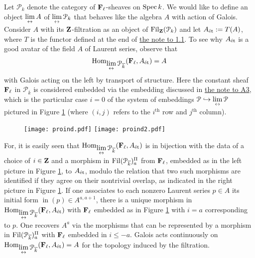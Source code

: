 \documentclass[deligne.tex]{subfiles}
\begin{document}
Let $\mathcal P_k$ denote the category of $\mathbf{F}_\ell$-sheaves on $\operatorname{Spec} k$.
We would like to define an object $\displaystyle\lim_{\leftrightarrow} A$ of $\displaystyle\lim_{\leftrightarrow}\mathcal P_k$ that
behaves like the algebra $A$ with action of Galois.
Consider $A$ with its $\mathbf{Z}$-filtration as an object of $\operatorname{Fil}_{\mathbf{Z}}(\mathcal P_k)$
and let $A_{\text{\'et}}:=T(A)$, where $T$ is the functor defined at the end of
\hyperref[glue:1.1]{the note to 1.1}.
To see why $A_{\text{\'et}}$ is a good avatar of the field $A$ of Laurent 
series, observe that
\begin{equation*}
	\operatorname{Hom}_{\displaystyle\lim_{\leftrightarrow}\mathcal P_{\overline k}}(\mathbf{F}_\ell,A_{\text{\'et}})=A
\end{equation*}
with Galois acting on the left by transport of structure.
Here the constant sheaf $\mathbf{F}_\ell$ in $\mathcal P_{\overline k}$ is
considered embedded via the embedding discussed in
\hyperref[glue:A3]{the note to A3},
which is the particular case $i=0$ of the system of embeddings
$\mathcal P\hookrightarrow\displaystyle\lim_{\leftrightarrow}\mathcal P$ pictured in
Figure \ref{fig:proind} (where $(i,j)$ refers to the $i^\text{th}$ row and
$j^\text{th}$ column).
\begin{figure}[h]
\centering
\texttt{[image: proind.pdf]}\hspace{3em}
\texttt{[image: proind2.pdf]}
\caption{}
\label{fig:proind}
\end{figure}
For, it is easily seen that
$\operatorname{Hom}_{\displaystyle\lim_{\leftrightarrow}\mathcal P_{\overline k}}(\mathbf{F}_\ell,A_{\text{\'et}})$
is in bijection with the data of a choice of $i\in\mathbf{Z}$ and a morphism in
$\operatorname{Fil}(\mathcal P_{\overline k})_a^\Pi$ from $\mathbf{F}_\ell$, embedded as in the
left picture in Figure \ref{fig:proind}, to $A_{\text{\'et}}$, modulo the
relation that two such morphisms are identified if they agree on their
nontrivial overlap, as indicated in the right picture in
Figure \ref{fig:proind}. If one associates to each nonzero Laurent series
$p\in A$ its initial form $\operatorname{in}(p)\in A^{a,a+1}$, there is a
unique morphism in $\operatorname{Hom}_{\displaystyle\lim_{\leftrightarrow}\mathcal P_{\overline k}}(\mathbf{F}_\ell,A_{\text{\'et}})$
with $\mathbf{F}_\ell$ embedded as in Figure \ref{fig:proind} with $i=a$
corresponding to $p$. One recovers $A^a$ via the morphisms that can be
represented by a morphism in $\operatorname{Fil}(\mathcal P_{\overline k})_a^\Pi$ with
$\mathbf{F}_\ell$ embedded in $i\leq-a$. Galois acts continuously on
$\operatorname{Hom}_{\displaystyle\lim_{\leftrightarrow}\mathcal P_{\overline k}}(\mathbf{F}_\ell,A_{\text{\'et}})=A$ for the 
topology induced by the filtration.
\end{document}
